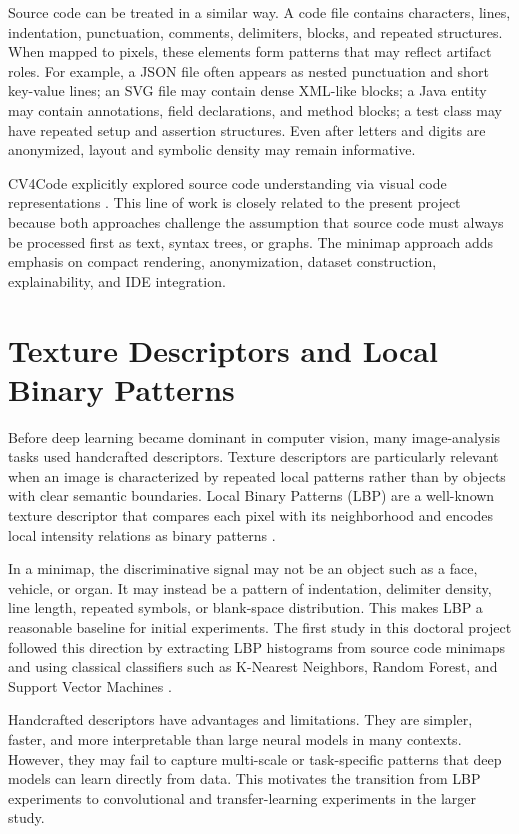 Source code can be treated in a similar way. A code file contains characters,
lines, indentation, punctuation, comments, delimiters, blocks, and repeated
structures. When mapped to pixels, these elements form patterns that may reflect
artifact roles. For example, a JSON file often appears as nested punctuation and
short key-value lines; an SVG file may contain dense XML-like blocks; a Java
entity may contain annotations, field declarations, and method blocks; a test
class may have repeated setup and assertion structures. Even after letters and
digits are anonymized, layout and symbolic density may remain informative.

CV4Code explicitly explored source code understanding via visual code
representations \cite{shi2023cv4code}. This line of work is closely related to
the present project because both approaches challenge the assumption that source
code must always be processed first as text, syntax trees, or graphs. The
minimap approach adds emphasis on compact rendering, anonymization, dataset
construction, explainability, and IDE integration.

\section{Texture Descriptors and Local Binary Patterns}

Before deep learning became dominant in computer vision, many image-analysis
tasks used handcrafted descriptors. Texture descriptors are particularly
relevant when an image is characterized by repeated local patterns rather than
by objects with clear semantic boundaries. Local Binary Patterns (LBP) are a
well-known texture descriptor that compares each pixel with its neighborhood and
encodes local intensity relations as binary patterns
\cite{ojala2002lbp,maenpaa2005texture,martins2013database}.

In a minimap, the discriminative signal may not be an object such as a face,
vehicle, or organ. It may instead be a pattern of indentation, delimiter density,
line length, repeated symbols, or blank-space distribution. This makes LBP a
reasonable baseline for initial experiments. The first study in this doctoral
project followed this direction by extracting LBP histograms from source code
minimaps and using classical classifiers such as K-Nearest Neighbors, Random
Forest, and Support Vector Machines \cite{gebara2025iwssip}.

Handcrafted descriptors have advantages and limitations. They are simpler,
faster, and more interpretable than large neural models in many contexts.
However, they may fail to capture multi-scale or task-specific patterns that
deep models can learn directly from data. This motivates the transition from LBP
experiments to convolutional and transfer-learning experiments in the larger
study.


